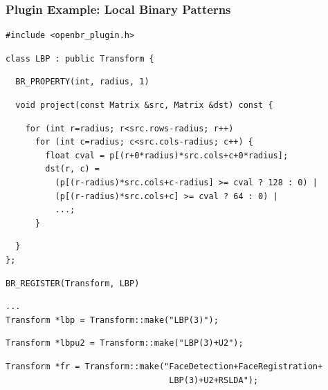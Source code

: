 \documentclass[12pt]{beamer}
\begin{document}
\begin{frame}[fragile]
\frametitle{Plugin Example: Local Binary Patterns}
{\footnotesize
\pause
\begin{verbatim}
#include <openbr_plugin.h>
\end{verbatim}
\vspace{-24pt}
\pause
\begin{verbatim}
class LBP : public Transform {
\end{verbatim}
\vspace{-24pt}
\pause
\begin{verbatim}
  BR_PROPERTY(int, radius, 1)
\end{verbatim}
\vspace{-24pt}
\pause
\begin{verbatim}
  void project(const Matrix &src, Matrix &dst) const {
\end{verbatim}
\vspace{-24pt}
\pause
\begin{verbatim}
    for (int r=radius; r<src.rows-radius; r++)
      for (int c=radius; c<src.cols-radius; c++) {
        float cval = p[(r+0*radius)*src.cols+c+0*radius];
        dst(r, c) =
          (p[(r-radius)*src.cols+c-radius] >= cval ? 128 : 0) |
          (p[(r-radius)*src.cols+c] >= cval ? 64 : 0) |
          ...;
      }
\end{verbatim}
\vspace{-24pt}
\pause
\begin{verbatim}
  }
};
\end{verbatim}
\vspace{-24pt}
\pause
\begin{verbatim}
BR_REGISTER(Transform, LBP)
\end{verbatim}
\vspace{-24pt}
\pause
\begin{verbatim}
...
Transform *lbp = Transform::make("LBP(3)");
\end{verbatim}
\vspace{-24pt}
\pause
\begin{verbatim}
Transform *lbpu2 = Transform::make("LBP(3)+U2");
\end{verbatim}
\vspace{-24pt}
\pause
\begin{verbatim}
Transform *fr = Transform::make("FaceDetection+FaceRegistration+
                                 LBP(3)+U2+RSLDA");
\end{verbatim}
}
\end{frame}
\end{document}
